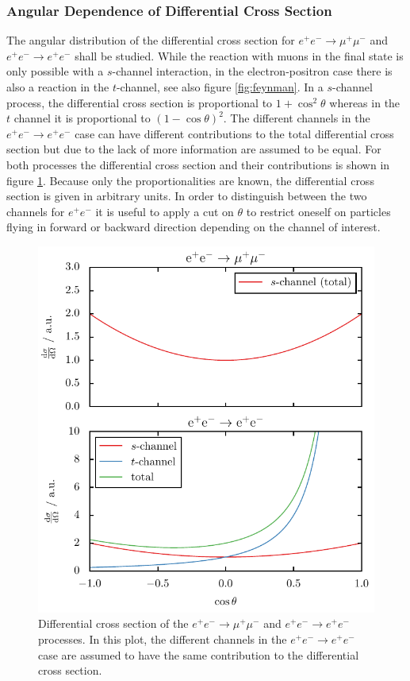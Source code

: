 \documentclass[11pt, a4paper]{article}
\numberwithin{equation}{section}
\begin{document}
\subsubsection{Angular Dependence of Differential Cross Section}
The angular distribution of the differential cross section for  $e^+e^-\rightarrow \mu^+\mu^-$ and $e^+e^-\rightarrow e^+e^-$ shall be studied.
While the reaction with muons in the final state is only possible with a $s$-channel interaction, in the electron-positron case there is also a reaction in the $t$-channel, see also figure \ref{fig:feynman}.
In a $s$-channel process, the differential cross section is proportional to $1+\cos^2\theta$ whereas in the $t$ channel it is proportional to $(1-\cos\theta)^2$.
The different channels in the $e^+e^-\rightarrow e^+e^-$ case can have different contributions to the total differential cross section but due to the lack of more information are assumed to be equal.
For both processes the differential cross section and their contributions is shown in figure \ref{fig:channels}.
Because only the proportionalities are known, the differential cross section is given in arbitrary units.
In order to distinguish between the two channels for $e^+e^-$ it is useful to apply a cut on $\theta$ to restrict oneself on particles flying in forward or backward direction depending on the channel of interest.
\begin{figure}[h]
	\centering
	\includegraphics{./figures/s_t_channel.pdf}
	\caption{Differential cross section of the $e^+e^-\rightarrow \mu^+\mu^-$ and $e^+e^-\rightarrow e^+e^-$ processes. In this plot, the different channels in the  $e^+e^-\rightarrow e^+e^-$ case are assumed to have the same contribution to the differential cross section.}
	\label{fig:channels}
\end{figure}
\end{document}
